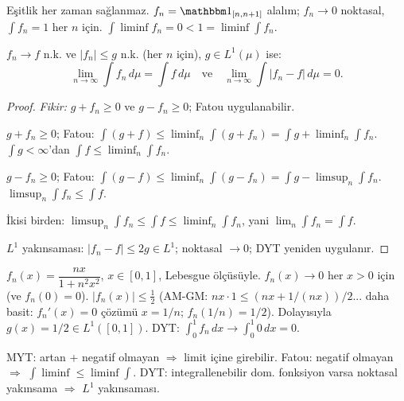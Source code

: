 \begin{hataanalizi}
Eşitlik her zaman sağlanmaz. $f_n = \gostf{[n,n+1]}$ alalım; $f_n \to 0$ noktasal,
$\int f_n = 1$ her $n$ için. $\int \liminf f_n = 0 < 1 = \liminf \int f_n$.
\end{hataanalizi}

\begin{teorem}\label{thm:dyt}
$f_n \to f$ n.k. ve $|f_n| \leq g$ n.k. (her $n$ için), $g \in L^1(\mu)$ ise:
\[
  \lim_{n\to\infty} \int f_n \, d\mu = \int f \, d\mu
  \quad \text{ve} \quad
  \lim_{n\to\infty} \int |f_n - f| \, d\mu = 0.
\]
\end{teorem}

\begin{proof}
\textit{Fikir:} $g + f_n \geq 0$ ve $g - f_n \geq 0$; Fatou uygulanabilir.

\medskip

$g + f_n \geq 0$; Fatou:
$\int (g + f) \leq \liminf_n \int (g + f_n) = \int g + \liminf_n \int f_n$.
$\int g < \infty$'dan $\int f \leq \liminf_n \int f_n$.

$g - f_n \geq 0$; Fatou:
$\int (g - f) \leq \liminf_n \int (g - f_n) = \int g - \limsup_n \int f_n$.
$\limsup_n \int f_n \leq \int f$.

İkisi birden: $\limsup_n \int f_n \leq \int f \leq \liminf_n \int f_n$,
yani $\lim_n \int f_n = \int f$.

$L^1$ yakınsaması: $|f_n - f| \leq 2g \in L^1$; noktasal $\to 0$; DYT yeniden uygulanır.
\end{proof}

\begin{ornek}\label{ex:dytuyg}
$f_n(x) = \dfrac{nx}{1 + n^2 x^2}$, $x \in [0,1]$, Lebesgue ölçüsüyle.
$f_n(x) \to 0$ her $x > 0$ için (ve $f_n(0) = 0$).
$|f_n(x)| \leq \frac{1}{2}$ (AM-GM: $nx \cdot 1 \leq (nx + 1/(nx))/2$... daha basit:
$f_n'(x) = 0$ çözümü $x = 1/n$; $f_n(1/n) = 1/2$). Dolayısıyla $g(x) = 1/2 \in L^1([0,1])$.
DYT: $\int_0^1 f_n \, dx \to \int_0^1 0 \, dx = 0$.
\end{ornek}

\begin{mikroozet}[§1.7 özeti]
MYT: artan + negatif olmayan $\Rightarrow$ limit içine girebilir.
Fatou: negatif olmayan $\Rightarrow$ $\int \liminf \leq \liminf \int$.
DYT: integrallenebilir dom. fonksiyon varsa noktasal yakınsama $\Rightarrow$ $L^1$ yakınsaması.
\end{mikroozet}


